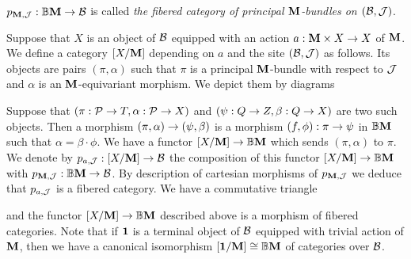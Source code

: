 \begin{definition}
$p_{\mathbf{M},{\mathcal J}}:\mathbb{B}\mathbf{M}\rightarrow {\mathcal B}$ is called \textit{the fibered category of principal $\mathbf{M}$-bundles on $({\mathcal B},{\mathcal J})$}.
\end{definition}
\noindent
Suppose that $X$ is an object of ${\mathcal B}$ equipped with an action $a:\mathbf{M}\times X\rightarrow X$ of $\mathbf{M}$. We define a category $[X/\mathbf{M}]$ depending on $a$ and the site $({\mathcal B},{\mathcal J})$ as follows. Its objects are pairs $(\pi,\alpha)$ such that $\pi$ is a principal $\mathbf{M}$-bundle with respect to ${\mathcal J}$ and $\alpha$ is an $\mathbf{M}$-equivariant morphism. We depict them by diagrams
\begin{center}
\end{center}
Suppose that $(\pi:{\mathcal P}\rightarrow T,\alpha:{\mathcal P}\rightarrow X)$ and $(\psi:Q\rightarrow Z,\beta:Q\rightarrow X)$ are two such objects. Then a morphism $(\pi,\alpha)\rightarrow (\psi,\beta)$ is a morphism $(f,\phi):\pi\rightarrow \psi$ in $\mathbb{B}\mathbf{M}$ such that $\alpha = \beta \cdot \phi$. We have a functor $[X/\mathbf{M}] \rightarrow \mathbb{B}\mathbf{M}$ which sends $(\pi, \alpha)$ to $\pi$. We denote by $p_{a,{\mathcal J}}:[X/\mathbf{M}]\rightarrow {\mathcal B}$ the composition of this functor $[X/\mathbf{M}] \rightarrow \mathbb{B}\mathbf{M}$ with $p_{\mathbf{M},{\mathcal J}}:\mathbb{B}\mathbf{M}\rightarrow {\mathcal B}$. By description of cartesian morphisms of $p_{\mathbf{M},{\mathcal J}}$ we deduce that $p_{a,{\mathcal J}}$ is a fibered category. We have a commutative triangle
\begin{center}
\end{center}
and the functor $[X/\mathbf{M}]\rightarrow \mathbb{B}\mathbf{M}$ described above is a morphism of fibered categories. Note that if $\mathbf{1}$ is a terminal object of ${\mathcal B}$ equipped with trivial action of $\mathbf{M}$, then we have a canonical isomorphism $[\mathbf{1}/\mathbf{M}] \cong \mathbb{B}\mathbf{M}$ of categories over ${\mathcal B}$.

